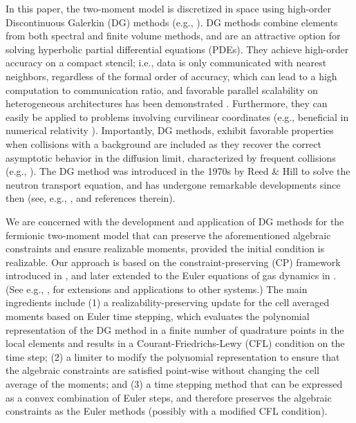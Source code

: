 In this paper, the two-moment model is discretized in space using high-order Discontinuous Galerkin (DG) methods (e.g., \cite{cockburnShu_2001,hesthavenWarburton_2008}).  
DG methods combine elements from both spectral and finite volume methods, and are an attractive option for solving hyperbolic partial differential equations (PDEs).  
They achieve high-order accuracy on a compact stencil; i.e., data is only communicated with nearest neighbors, regardless of the formal order of accuracy, which can lead to a high computation to communication ratio, and favorable parallel scalability on heterogeneous architectures has been demonstrated \cite{klockner_etal_2009}.  
Furthermore, they can easily be applied to problems involving curvilinear coordinates (e.g., beneficial in numerical relativity \cite{teukolsky_2016}).  
Importantly, DG methods, exhibit favorable properties when collisions with a background are included as they recover the correct asymptotic behavior in the diffusion limit, characterized by frequent collisions (e.g., \cite{larsenMorel_1989,adams_2001,guermondKanschat_2010}).  
The DG method was introduced in the 1970s by Reed \& Hill \cite{reedHill_1973} to solve the neutron transport equation, and has undergone remarkable developments since then (see, e.g., \cite{shu_2016}, and references therein).  

We are concerned with the development and application of DG methods for the fermionic two-moment model that can preserve the aforementioned algebraic constraints and ensure realizable moments, provided the initial condition is realizable.  
Our approach is based on the constraint-preserving (CP) framework introduced in \cite{zhangShu_2010a}, and later extended to the Euler equations of gas dynamics in \cite{zhangShu_2010b}.  
(See e.g., \cite{xing_etal_2010,zhangShu_2011,olbrant_etal_2012,cheng_etal_2013,zhang_etal_2013,endeve_etal_2015,wuTang_2015}, for extensions and applications to other systems.)  
The main ingredients include (1) a realizability-preserving update for the cell averaged moments based on Euler time stepping, which evaluates the polynomial representation of the DG method in a finite number of quadrature points in the local elements and results in a Courant-Friedrichs-Lewy (CFL) condition on the time step; (2) a limiter to modify the polynomial representation to ensure that the algebraic constraints are satisfied point-wise without changing the cell average of the moments; and (3) a time stepping method that can be expressed as a convex combination of Euler steps, and therefore preserves the algebraic constraints as the Euler methods (possibly with a modified CFL condition).  

